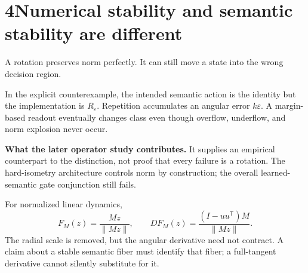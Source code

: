 \documentclass[11pt]{article}
\begin{document}
\section*{4\quad Numerical stability and semantic stability are different}
A rotation preserves norm perfectly. It can still move a state into the wrong decision region.
\begin{center}
\end{center}
In the explicit counterexample, the intended semantic action is the identity but the implementation is $R_\varepsilon$. Repetition accumulates an angular error $k\varepsilon$. A margin-based readout eventually changes class even though overflow, underflow, and norm explosion never occur.

\begin{scopebox}
\textbf{What the later operator study contributes.} It supplies an empirical counterpart to the distinction, not proof that every failure is a rotation. The hard-isometry architecture controls norm by construction; the overall learned-semantic gate conjunction still fails.
\end{scopebox}
For normalized linear dynamics,
\[
 F_M(z)=\frac{Mz}{\|Mz\|},\qquad
 DF_M(z)=\frac{(I-uu^{\mathsf T})M}{\|Mz\|}.
\]
The radial scale is removed, but the angular derivative need not contract. A claim about a stable semantic fiber must identify that fiber; a full-tangent derivative cannot silently substitute for it.
\clearpage
\end{document}
